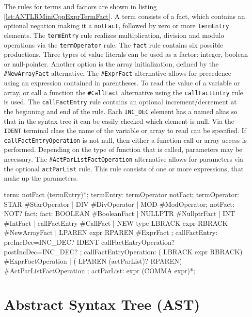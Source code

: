 The rules for terms and factors are shown in listing \ref{lst:ANTLRMiniCppExprTermFact}. A term consists of a fact, which contains an optional negation making it a \verb|notFact|, followed by zero or more \verb|termEntry| elements. The \verb|termEntry| rule realizes multiplication, division and modulo operations via the \verb|termOperator| rule. The \verb|fact| rule contains six possible productions. Three types of value literals can be used as a factor: integer, boolean or null-pointer. Another option is the array initialization, defined by the \verb|#NewArrayFact| alternative. The \verb|#ExprFact| alternative allows for precedence using an expression contained in parentheses. To read the value of a variable or array, or call a function the \verb|#CallFact| alternative using the \verb|callFactEntry| rule is used. The \verb|callFactEntry| rule contains an optional increment/decrement at the beginning and end of the rule. Each \verb|INC_DEC| element has a named alias so that in the syntax tree it can be easily checked which element is null. Via the \verb|IDENT| terminal class the name of the variable or array to read can be specified. If \verb|callFactEntryOperation| is not null, then either a function call or array access is performed. Depending on the type of function that is called, parameters may be necessary. The \verb|#ActParListFactOperation| alternative allows for parameters via the optional \verb|actParList| rule. This rule consists of one or more expressions, that make up the parameters.     

\begin{AntlrCode}[float,numbers=none,caption=Expression rules for terms and factors of the MiniC++ ANTLR grammar., label=lst:ANTLRMiniCppExprTermFact]
term:             notFact (termEntry)*;
termEntry:        termOperator notFact;
termOperator:     STAR #StarOperator
                | DIV #DivOperator
                | MOD #ModOperator;
notFact:          NOT? fact;
fact:             BOOLEAN #BooleanFact
                | NULLPTR #NullptrFact
                | INT     #IntFact
                | callFactEntry         #CallFact
                | NEW type LBRACK expr RBRACK #NewArrayFact
                | LPAREN expr RPAREN          #ExprFact
                ;
callFactEntry:    preIncDec=INC_DEC?
                  IDENT
                  callFactEntryOperation?
                  postIncDec=INC_DEC?
                  ;
callFactEntryOperation:
      ( LBRACK expr    RBRACK)          #ExprFactOperation
    | ( LPAREN (actParList)?    RPAREN) #ActParListFactOperation
    ;
actParList:       expr (COMMA expr)*;
\end{AntlrCode}

\section{Abstract Syntax Tree (AST)}

